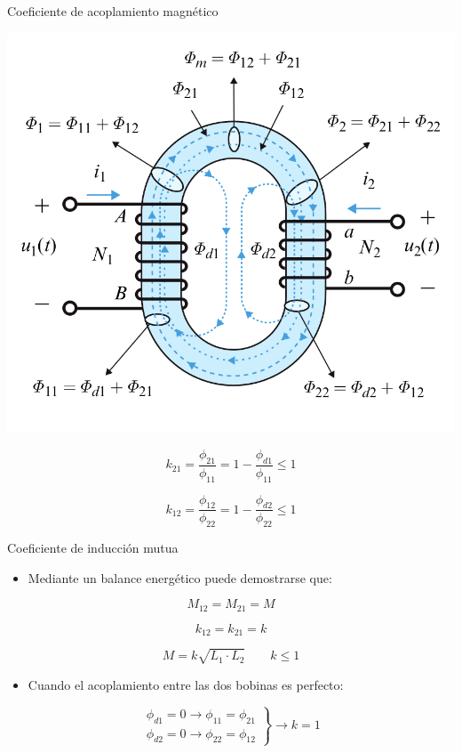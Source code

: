 \documentclass[xcolor={usenames,svgnames,dvipsnames}]{beamer}
\begin{document}
\begin{frame}[label={sec:orga4c712f}]{Coeficiente de acoplamiento magnético}
\begin{center}
\includegraphics[height=0.58\textheight]{figs/Acoplamiento1.png}
\end{center}

\[
  k_{21} = \frac{\phi_{21}}{\phi_{11}} = 1 - \frac{\phi_{d1}}{\phi_{11}} \leq 1
\]

\[
  k_{12} = \frac{\phi_{12}}{\phi_{22}} = 1 - \frac{\phi_{d2}}{\phi_{22}} \leq 1
\]
\end{frame}



\begin{frame}[label={sec:orge45a45a}]{Coeficiente de inducción mutua}
\begin{itemize}
\item Mediante un balance energético puede demostrarse que:
\end{itemize}
\[
  M_{12} = M_{21} = M
\]

\[
  k_{12} = k_{21} = k
\]

\[
  \boxed{M = k \sqrt{L_1 \cdot L_2}} \qquad  k \leq 1
\]

\begin{itemize}
\item Cuando el acoplamiento entre las dos bobinas es perfecto:
\end{itemize}

\[\left.
\begin{array}{cc}
  \phi_{d1} = 0 \rightarrow   \phi_{11} = \phi_{21}\\
  \phi_{d2} = 0 \rightarrow \phi_{22} = \phi_{12} 
  \end{array} \right\} \rightarrow k = 1
\]
\end{frame}
\end{document}
